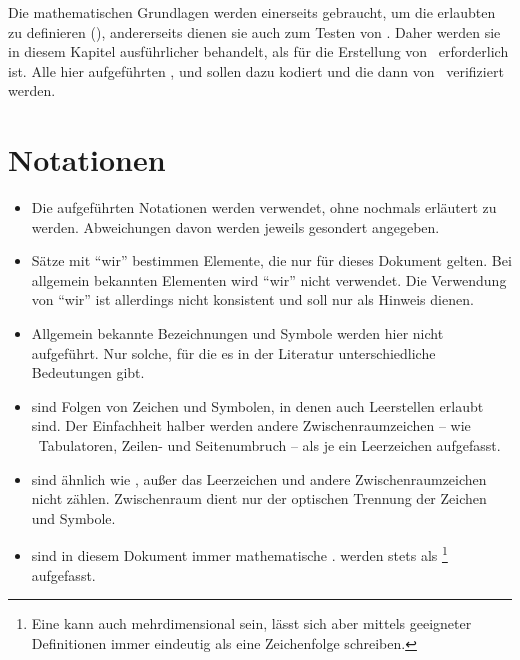 Die mathematischen Grundlagen werden einerseits gebraucht, um die erlaubten  zu definieren (), andererseits dienen sie auch zum Testen von \ASBA.
Daher werden sie in diesem Kapitel ausführlicher behandelt, als für die Erstellung von \ASBA\ erforderlich ist.
Alle hier aufgeführten ,  und  sollen dazu kodiert und die  dann von \ASBA\ verifiziert werden.

\section{Notationen}%
\label{sec:Notationen}

\begin{itemize}
	\item Die  aufgeführten Notationen werden  verwendet, ohne nochmals erläutert zu werden. Abweichungen davon werden jeweils gesondert angegeben.
	\item Sätze mit \enquote{wir} bestimmen Elemente, die nur für dieses Dokument gelten.
	Bei allgemein bekannten Elementen wird \enquote{wir} nicht verwendet.
	Die Verwendung von \enquote{wir} ist allerdings nicht konsistent und soll nur als Hinweis dienen.
	\item Allgemein bekannte Bezeichnungen und Symbole werden hier nicht aufgeführt.
	Nur solche, für die es in der Literatur unterschiedliche Bedeutungen gibt.
	\item \emph{} sind Folgen von Zeichen und Symbolen, in denen auch Leerstellen erlaubt sind.
	Der Einfachheit halber werden andere Zwischenraumzeichen -- wie \textzB\ Tabulatoren, Zeilen- und Seitenumbruch -- als je ein Leerzeichen aufgefasst.
	\item \emph{} sind ähnlich wie , außer das Leerzeichen und andere Zwischenraumzeichen nicht zählen.
	Zwischenraum dient nur der optischen Trennung der Zeichen und Symbole.
	\item \emph{} sind in diesem Dokument immer mathematische .
	 werden stets als %
	\footnote{%
		Eine  kann auch mehrdimensional sein, lässt sich aber mittels geeigneter Definitionen immer eindeutig als eine Zeichenfolge schreiben.%
	}
	aufgefasst.
\end{itemize}

